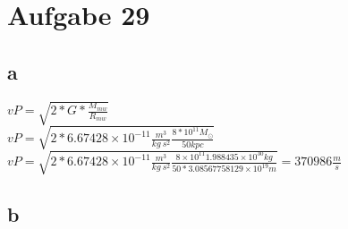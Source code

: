 \section{Aufgabe 29}
\subsection{a}
$vP = \sqrt{2*G*\frac{M_{mw}}{R_{mw}}}$\\
$vP = \sqrt{2*6.67428 \times 10^{-11} \frac{m^3}{kg ~ s^2}  \frac{8*10^{11} M_{\odot}}{50 kpc}}$ \\
$vP = \sqrt{2*6.67428 \times 10^{-11} \frac{m^3}{kg ~ s^2}  \frac{8 \times 10^{11} 1.988435 \times 10^{30} kg}{50*3.08567758129 \times 10^{19} m}} = 370986 \frac{m}{s}$
\subsection{b}

